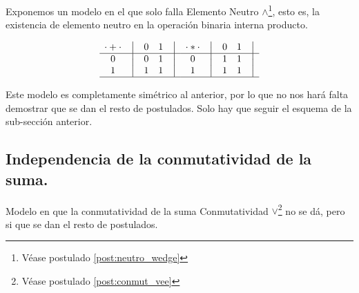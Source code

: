 	Exponemos un modelo en el que solo falla Elemento Neutro $\wedge$\footnote{Véase postulado \ref{post:neutro_wedge}}, esto es, la existencia de elemento neutro en la operación binaria interna producto.



\[
    \begin{matrix}
        {\cdot + \cdot} & \big{\vert} & {0} & {1} & \big{\vert} \\
        \hline
        {0}             & \big{\vert} & {0} & {1} & \big{\vert} \\
        {1}             & \big{\vert} & {1} & {1} & \big{\vert} \\
        \hline
    \end{matrix}
    \quad
    \begin{matrix}
        {\cdot * \cdot} & \big{\vert} & {0} & {1} & \big{\vert} \\
        \hline
        {0}                   & \big{\vert} & {1} & {1} & \big{\vert} \\
        {1}                   & \big{\vert} & {1} & {1} & \big{\vert} \\
        \hline
    \end{matrix}
\]


	Este modelo es completamente simétrico al anterior, por lo que no nos
hará falta demostrar que se dan el resto de postulados. Solo hay que seguir
el esquema de la sub-sección anterior.



\subsection{Independencia de la conmutatividad de la suma.}



	Modelo en que la conmutatividad de la suma Conmutatividad $\vee$\footnote{Véase postulado \ref{post:conmut_vee}} no se dá, pero
si que se dan el resto de postulados.



